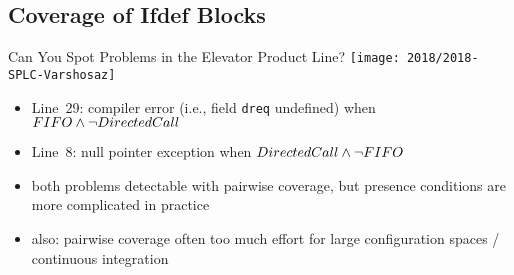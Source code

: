 \subsection{Coverage of Ifdef Blocks}
\begin{frame}[b]
	\begin{example}{Can You Spot Problems in the Elevator Product Line?\mysource{\samplingsurvey}}
		\centering\texttt{[image: 2018/2018-SPLC-Varshosaz]}
	\end{example}
	\pause
	\begin{itemize}
		\item<+-> Line~29: compiler error (i.e., field \texttt{dreq} undefined) %
		when $FIFO \wedge \neg DirectedCall$
		\item<+-> Line~8: null pointer exception %
		when $DirectedCall \wedge \neg FIFO$
		\item<+-> both problems detectable with pairwise coverage, but presence conditions are more complicated in practice
		\item<+-> also: pairwise coverage often too much effort for large configuration spaces / continuous integration
	\end{itemize}
\end{frame}

